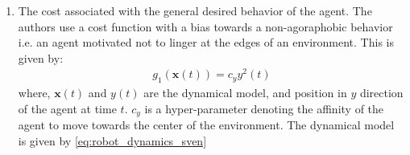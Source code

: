 \begin{enumerate}
	\item The cost associated with the general desired behavior of the agent. The authors use a cost function with a bias towards a non-agoraphobic behavior i.e. an agent motivated not to linger at the edges of an environment. This is given by:
	\begin{align}
	g_{1}(\textbf{x}(t)) = c_{y}y^{2}(t)
	\end{align}
	where, $\textbf{x}(t)$ and $y(t)$ are the dynamical model, and position in $y$ direction of the agent at time $t$. $c_y$ is a hyper-parameter denoting the affinity of the agent to move towards the center of the environment. The dynamical model is given by \autoref{eq:robot_dynamics_sven}
\end{enumerate}
